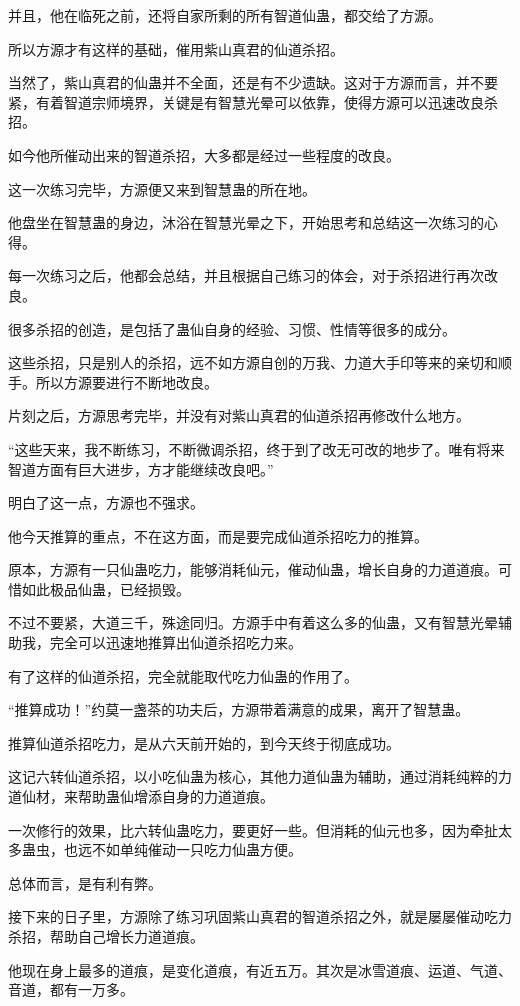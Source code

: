 \begin{this_body}
并且，他在临死之前，还将自家所剩的所有智道仙蛊，都交给了方源。

所以方源才有这样的基础，催用紫山真君的仙道杀招。

当然了，紫山真君的仙蛊并不全面，还是有不少遗缺。这对于方源而言，并不要紧，有着智道宗师境界，关键是有智慧光晕可以依靠，使得方源可以迅速改良杀招。

如今他所催动出来的智道杀招，大多都是经过一些程度的改良。

这一次练习完毕，方源便又来到智慧蛊的所在地。

他盘坐在智慧蛊的身边，沐浴在智慧光晕之下，开始思考和总结这一次练习的心得。

每一次练习之后，他都会总结，并且根据自己练习的体会，对于杀招进行再次改良。

很多杀招的创造，是包括了蛊仙自身的经验、习惯、性情等很多的成分。

这些杀招，只是别人的杀招，远不如方源自创的万我、力道大手印等来的亲切和顺手。所以方源要进行不断地改良。

片刻之后，方源思考完毕，并没有对紫山真君的仙道杀招再修改什么地方。

“这些天来，我不断练习，不断微调杀招，终于到了改无可改的地步了。唯有将来智道方面有巨大进步，方才能继续改良吧。”

明白了这一点，方源也不强求。

他今天推算的重点，不在这方面，而是要完成仙道杀招吃力的推算。

原本，方源有一只仙蛊吃力，能够消耗仙元，催动仙蛊，增长自身的力道道痕。可惜如此极品仙蛊，已经损毁。

不过不要紧，大道三千，殊途同归。方源手中有着这么多的仙蛊，又有智慧光晕辅助我，完全可以迅速地推算出仙道杀招吃力来。

有了这样的仙道杀招，完全就能取代吃力仙蛊的作用了。

“推算成功！”约莫一盏茶的功夫后，方源带着满意的成果，离开了智慧蛊。

推算仙道杀招吃力，是从六天前开始的，到今天终于彻底成功。

这记六转仙道杀招，以小吃仙蛊为核心，其他力道仙蛊为辅助，通过消耗纯粹的力道仙材，来帮助蛊仙增添自身的力道道痕。

一次修行的效果，比六转仙蛊吃力，要更好一些。但消耗的仙元也多，因为牵扯太多蛊虫，也远不如单纯催动一只吃力仙蛊方便。

总体而言，是有利有弊。

接下来的日子里，方源除了练习巩固紫山真君的智道杀招之外，就是屡屡催动吃力杀招，帮助自己增长力道道痕。

他现在身上最多的道痕，是变化道痕，有近五万。其次是冰雪道痕、运道、气道、音道，都有一万多。


\end{this_body}
